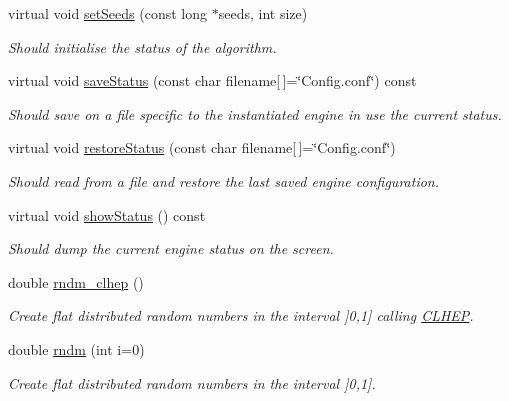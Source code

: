 \begin{DoxyCompactItemize}
virtual void \hyperlink{class_d_d4hep_1_1_simulation_1_1_geant4_random_af110cf82c38501f6a437f3b0b7fc9bf4}{set\+Seeds} (const long $\ast$seeds, int size)
\begin{DoxyCompactList}\small\item\em Should initialise the status of the algorithm. \end{DoxyCompactList}\item 
virtual void \hyperlink{class_d_d4hep_1_1_simulation_1_1_geant4_random_aba1523a92243a5abcbd41f55041c120b}{save\+Status} (const char filename\mbox{[}$\,$\mbox{]}=\char`\"{}Config.\+conf\char`\"{}) const
\begin{DoxyCompactList}\small\item\em Should save on a file specific to the instantiated engine in use the current status. \end{DoxyCompactList}\item 
virtual void \hyperlink{class_d_d4hep_1_1_simulation_1_1_geant4_random_aad43065d6a4213d3ac0f3d9d024ce5ff}{restore\+Status} (const char filename\mbox{[}$\,$\mbox{]}=\char`\"{}Config.\+conf\char`\"{})
\begin{DoxyCompactList}\small\item\em Should read from a file and restore the last saved engine configuration. \end{DoxyCompactList}\item 
virtual void \hyperlink{class_d_d4hep_1_1_simulation_1_1_geant4_random_a44d4509bbb3d7800b12a75b2fbc6a066}{show\+Status} () const
\begin{DoxyCompactList}\small\item\em Should dump the current engine status on the screen. \end{DoxyCompactList}\item 
double \hyperlink{class_d_d4hep_1_1_simulation_1_1_geant4_random_a691d3cc880c5db6fab4699784a8b375c}{rndm\+\_\+clhep} ()
\begin{DoxyCompactList}\small\item\em Create flat distributed random numbers in the interval \mbox{]}0,1\mbox{]} calling \hyperlink{namespace_c_l_h_e_p}{C\+L\+H\+EP}. \end{DoxyCompactList}\item 
double \hyperlink{class_d_d4hep_1_1_simulation_1_1_geant4_random_a4aaab596ee59a7ae5cbee9cbfde250d5}{rndm} (int i=0)
\begin{DoxyCompactList}\small\item\em Create flat distributed random numbers in the interval \mbox{]}0,1\mbox{]}. \end{DoxyCompactList}\item 

\end{DoxyCompactItemize}
